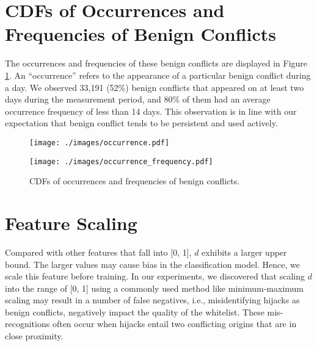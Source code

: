\section{CDFs of Occurrences and Frequencies of Benign Conflicts} \label{app:cdf_benign_conflicts}
The occurrences and frequencies of these benign conflicts are displayed in Figure \ref{fig:occur_fre_cdf}. An ``occurrence'' refers to the appearance of a particular benign conflict during a day. 
 We observed 33,191 (52\%) benign conflicts that appeared on at least two days during the measurement period, and 80\% of them had an average occurrence frequency of less than 14 days.
 This observation is in line with our expectation that benign conflict tends to be persistent and used actively.
 
\begin{figure}[t!]
  \centering
  \begin{minipage}[b]{0.4\linewidth}
    \centering
    \texttt{[image: ./images/occurrence.pdf]}
  \end{minipage}
  \hfill
  \begin{minipage}[b]{0.4\linewidth}
    \centering
    \texttt{[image: ./images/occurrence\_frequency.pdf]}
  \end{minipage}
  \vspace{-10pt}
  \caption{\small CDFs of occurrences and frequencies of benign conflicts.}
  \label{fig:occur_fre_cdf}
\end{figure}

\section{Feature Scaling} \label{app:feature_scale}
Compared with other features that fall into [0, 1], $d$ exhibits a larger upper bound. The larger values may cause bias in the classification model. Hence, we scale this feature before training.
In our experiments, we discovered that scaling $d$ into the range of [0, 1] using a commonly used method like minimum-maximum scaling may result in a number of false negatives, i.e., misidentifying hijacks as benign conflicts, negatively impact the quality of the whitelist.
These mis-recognitions often occur when hijacks entail two conflicting origins that are in close proximity.

